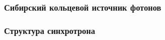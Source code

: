 \documentclass[14pt, hyperref = {colorlinks}]{beamer}
\begin{document}
\small
\begin{frame}
\frametitle{Сибирский кольцевой источник фотонов}\label{t1}
\begin{figure}[h]
	\center{}
	\begin{minipage}[h]{0.85\linewidth}
	\end{minipage}
	
	\hfill
	\center{}
	\begin{minipage}[h]{0.85\linewidth}
	\end{minipage}
\end{figure}
\end{frame}


\small
\begin{frame}
\frametitle{Структура синхротрона}\label{t1}
\begin{figure}[h]
\end{figure}
\end{frame}
\end{document}

